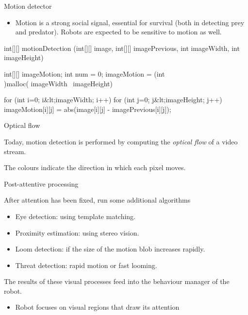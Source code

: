 \documentclass[compress]{beamer}
\begin{document}
\begin{frame}[fragile]{Motion detector}

\begin{itemize}

\item
  Motion is a strong social signal, essential for survival (both in
  detecting prey and predator). Robots are expected to be sensitive to
  motion as well.
\end{itemize}

\begin{matlabcode}
int[][] motionDetection (int[][] image,
        int[][] imagePrevious, int imageWidth, int
        imageHeight)

{
    int[][] imageMotion;
    int num = 0;
    imageMotion = (int\\)malloc( imageWidth \ imageHeight)

    for (int i=0; i&lt;imageWidth; i++)
    {
        for (int j=0; j&lt;imageHeight; j++)
        {
            imageMotion[i][j] = abs(image[i][j] - imagePrevious[i][j]);
        }
    }
}
\end{matlabcode}

\end{frame}

\begin{frame}{Optical flow}

    Today, motion detection is performed by computing the \emph{optical flow}
    of a video stream.


    The colours indicate the direction in which each pixel moves.


\end{frame}


\begin{frame}{Post-attentive processing}

After attention has been fixed, run some additional algorithms

\begin{itemize}

\item Eye detection: using template matching.
\item Proximity estimation: using stereo vision.
\item Loom detection: if the size of the motion blob increases rapidly.
\item Threat detection: rapid motion or fast looming.
\end{itemize}

The results of these visual processes feed into the behaviour manager of
the robot.

\begin{itemize}

\item
  Robot focuses on visual regions that draw its attention
\end{itemize}

\end{frame}
\end{document}
